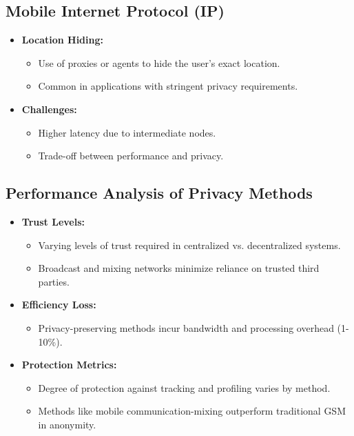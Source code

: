 \documentclass{article}
\begin{document}
\subsection{Mobile Internet Protocol (IP)}
\begin{itemize}
    \item \textbf{Location Hiding:}
    \begin{itemize}
        \item Use of proxies or agents to hide the user's exact location.
        \item Common in applications with stringent privacy requirements.
    \end{itemize}
    \item \textbf{Challenges:}
    \begin{itemize}
        \item Higher latency due to intermediate nodes.
        \item Trade-off between performance and privacy.
    \end{itemize}
\end{itemize}

\subsection{Performance Analysis of Privacy Methods}
\begin{itemize}
    \item \textbf{Trust Levels:}
    \begin{itemize}
        \item Varying levels of trust required in centralized vs. decentralized systems.
        \item Broadcast and mixing networks minimize reliance on trusted third parties.
    \end{itemize}
    \item \textbf{Efficiency Loss:}
    \begin{itemize}
        \item Privacy-preserving methods incur bandwidth and processing overhead (1-10\%).
    \end{itemize}
    \item \textbf{Protection Metrics:}
    \begin{itemize}
        \item Degree of protection against tracking and profiling varies by method.
        \item Methods like mobile communication-mixing outperform traditional GSM in anonymity.
    \end{itemize}
\end{itemize}
\end{document}
